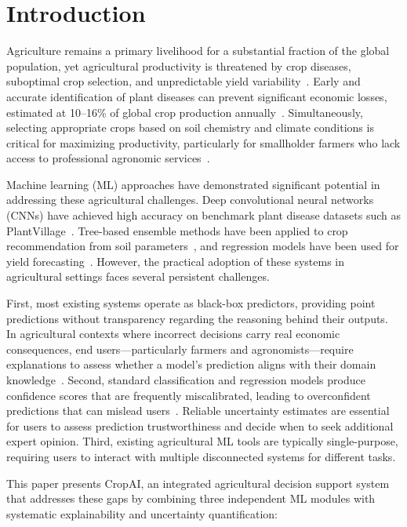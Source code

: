 \documentclass[conference]{IEEEtran}
\begin{document}
\section{Introduction}
\label{sec:introduction}

Agriculture remains a primary livelihood for a substantial fraction of the global population, yet agricultural productivity is threatened by crop diseases, suboptimal crop selection, and unpredictable yield variability~\cite{fao2021state}. Early and accurate identification of plant diseases can prevent significant economic losses, estimated at 10--16\% of global crop production annually~\cite{savary2019global}. Simultaneously, selecting appropriate crops based on soil chemistry and climate conditions is critical for maximizing productivity, particularly for smallholder farmers who lack access to professional agronomic services~\cite{lipper2014climate}.

Machine learning (ML) approaches have demonstrated significant potential in addressing these agricultural challenges. Deep convolutional neural networks (CNNs) have achieved high accuracy on benchmark plant disease datasets such as PlantVillage~\cite{mohanty2016using,hughes2015open}. Tree-based ensemble methods have been applied to crop recommendation from soil parameters~\cite{pudumalar2017crop}, and regression models have been used for yield forecasting~\cite{khaki2020comprehensive}. However, the practical adoption of these systems in agricultural settings faces several persistent challenges.

First, most existing systems operate as black-box predictors, providing point predictions without transparency regarding the reasoning behind their outputs. In agricultural contexts where incorrect decisions carry real economic consequences, end users---particularly farmers and agronomists---require explanations to assess whether a model's prediction aligns with their domain knowledge~\cite{arrieta2020explainable}. Second, standard classification and regression models produce confidence scores that are frequently miscalibrated, leading to overconfident predictions that can mislead users~\cite{guo2017calibration}. Reliable uncertainty estimates are essential for users to assess prediction trustworthiness and decide when to seek additional expert opinion. Third, existing agricultural ML tools are typically single-purpose, requiring users to interact with multiple disconnected systems for different tasks.

This paper presents CropAI, an integrated agricultural decision support system that addresses these gaps by combining three independent ML modules with systematic explainability and uncertainty quantification:
\end{document}
